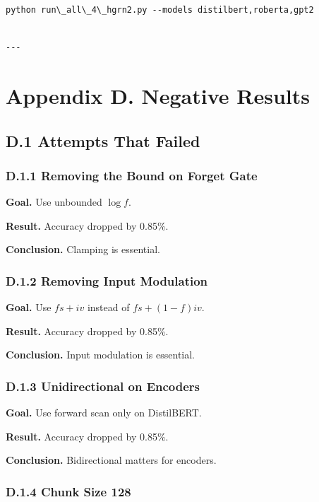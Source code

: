 \begin{lstlisting}
python run\_all\_4\_hgrn2.py --models distilbert,roberta,gpt2
\end{lstlisting}
\begin{lstlisting}

---
\end{lstlisting}

\section{Appendix D. Negative Results}

\subsection{D.1 Attempts That Failed}

\subsubsection{D.1.1 Removing the Bound on Forget Gate}

\textbf{Goal.} Use unbounded $\log f$.

\textbf{Result.} Accuracy dropped by 0.85\%.

\textbf{Conclusion.} Clamping is essential.

\subsubsection{D.1.2 Removing Input Modulation}

\textbf{Goal.} Use $f s + i v$ instead of $f s + (1-f) i v$.

\textbf{Result.} Accuracy dropped by 0.85\%.

\textbf{Conclusion.} Input modulation is essential.

\subsubsection{D.1.3 Unidirectional on Encoders}

\textbf{Goal.} Use forward scan only on DistilBERT.

\textbf{Result.} Accuracy dropped by 0.85\%.

\textbf{Conclusion.} Bidirectional matters for encoders.

\subsubsection{D.1.4 Chunk Size 128}

